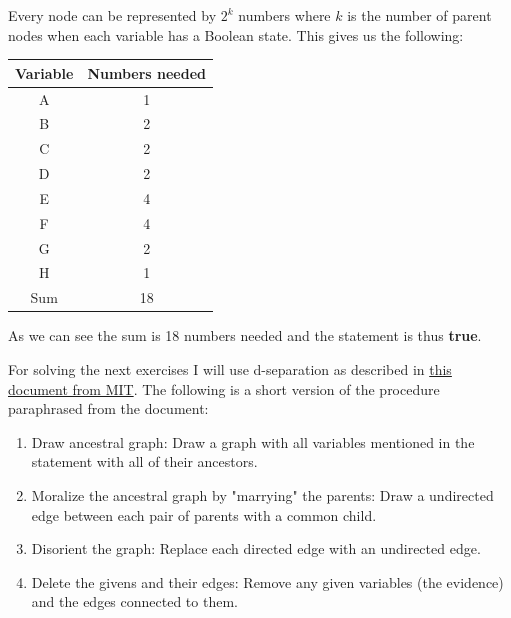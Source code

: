 \documentclass[10pt, a4paper, english]{../Template/NTNUoving}
\begin{document}
\begin{oppgave}
    \begin{punkt}
        Every node can be represented by $2^k$ numbers where $k$ is the number of parent nodes when each variable has a Boolean state.
        This gives us the following:
        \begin{center}
            \begin{tabular}{ |c|c| }
             \hline
             Variable & Numbers needed \\
             \hline
             A  & 1 \\
             \hline
             B &  2 \\
             \hline
             C &  2 \\
             \hline
             D &  2 \\
             \hline
             E &  4 \\
             \hline
             F &  4 \\
             \hline
             G &  2 \\
             \hline
             H &  1 \\
             \hline
             Sum &  18 \\
             \hline
            \end{tabular}
            \end{center}
            As we can see the sum is 18 numbers needed and the statement is thus \textbf{true}.
    \end{punkt}

    For solving the next exercises I will use d-separation as described in \href{http://web.mit.edu/jmn/www/6.034/d-separation.pdf}{this document from MIT}. The following is a short version of the procedure paraphrased from the document:
    \begin{enumerate}
        \item Draw ancestral graph: Draw a graph with all variables mentioned in the statement with all of their ancestors.
        \item Moralize the ancestral graph by "marrying" the parents: Draw a undirected edge between each pair of parents with a common child.
        \item Disorient the graph: Replace each directed edge with an undirected edge.
        \item Delete the givens and their edges: Remove any given variables (the evidence) and the edges connected to them.
    \end{enumerate}


\end{oppgave}
\end{document}
